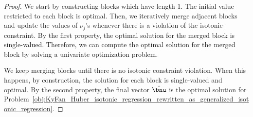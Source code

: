 \begin{proof}
    We start by constructing blocks which have length 1.
    The initial value restricted to each block is optimal.
    Then, we iteratively merge adjacent blocks and update the values of $\nu_j$'s whenever there is a violation of the isotonic constraint.
    By the first property, the optimal solution for the merged block is single-valued.
    Therefore, we can compute the optimal solution for the merged block by solving a univariate optimization problem.
    
    We keep merging blocks until there is no isotonic constraint violation.
    When this happens, by construction, the solution for each block is single-valued and optimal.
    By the second property, the final vector $\hat{\bnu}$ is the optimal solution for Problem~\eqref{obj:KyFan_Huber_isotonic_regression_rewritten_as_generalized_isotonic_regression}.
\end{proof}
%

%

%




